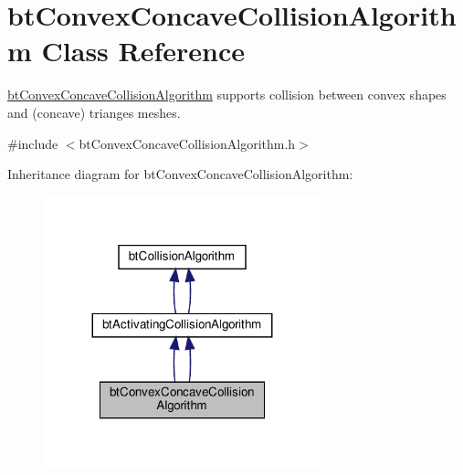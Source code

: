 \hypertarget{classbtConvexConcaveCollisionAlgorithm}{}\section{bt\+Convex\+Concave\+Collision\+Algorithm Class Reference}
\label{classbtConvexConcaveCollisionAlgorithm}


\hyperlink{classbtConvexConcaveCollisionAlgorithm}{bt\+Convex\+Concave\+Collision\+Algorithm} supports collision between convex shapes and (concave) trianges meshes.  




{\ttfamily \#include $<$bt\+Convex\+Concave\+Collision\+Algorithm.\+h$>$}



Inheritance diagram for bt\+Convex\+Concave\+Collision\+Algorithm\+:
\nopagebreak
\begin{figure}[H]
\begin{center}
\leavevmode
\includegraphics[width=227pt]{classbtConvexConcaveCollisionAlgorithm__inherit__graph}
\end{center}
\end{figure}


